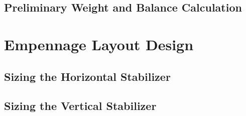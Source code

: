 \documentclass[conf]{new-aiaa}
\begin{document}
\subsection{Preliminary Weight and Balance Calculation}


\section{Empennage Layout Design}
\subsection{Sizing the Horizontal Stabilizer} %
\subsection{Sizing the Vertical Stabilizer}
\end{document}
